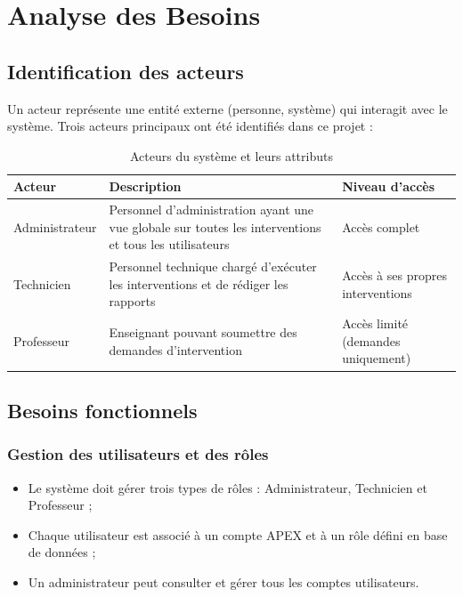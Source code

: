 \documentclass[12pt,a4paper,oneside]{report}
\begin{document}
\chapter{Analyse des Besoins}

\section{Identification des acteurs}

Un acteur représente une entité externe (personne, système) qui interagit avec le système. Trois acteurs principaux ont été identifiés dans ce projet :

\begin{table}[H]
  \centering
  \caption{Acteurs du système et leurs attributs}
  \begin{tabularx}{\linewidth}{@{}l X X@{}}
    \toprule
    \textbf{Acteur} & \textbf{Description} & \textbf{Niveau d'accès} \\
    \midrule
    Administrateur & Personnel d'administration ayant une vue globale sur toutes les interventions et tous les utilisateurs & Accès complet \\
    Technicien & Personnel technique chargé d'exécuter les interventions et de rédiger les rapports & Accès à ses propres interventions \\
    Professeur & Enseignant pouvant soumettre des demandes d'intervention & Accès limité (demandes uniquement) \\
    \bottomrule
  \end{tabularx}
  \label{tab:acteurs}
\end{table}

\section{Besoins fonctionnels}

\subsection{Gestion des utilisateurs et des rôles}

\begin{itemize}[leftmargin=2em]
  \item Le système doit gérer trois types de rôles : Administrateur, Technicien et Professeur ;
  \item Chaque utilisateur est associé à un compte APEX et à un rôle défini en base de données ;
  \item Un administrateur peut consulter et gérer tous les comptes utilisateurs.
\end{itemize}
\end{document}
